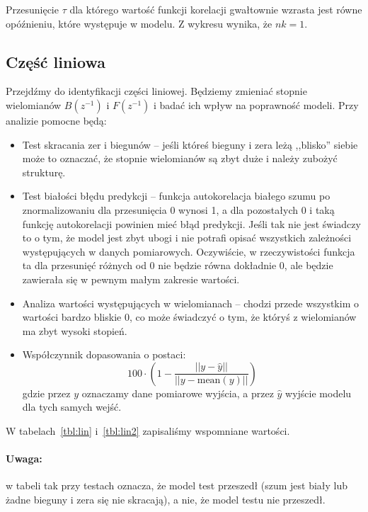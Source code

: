 \documentclass[11pt, a4paper]{article}
\begin{document}
Przesunięcie $\tau$ dla którego wartość funkcji korelacji gwałtownie wzrasta jest równe opóźnieniu, które występuje w modelu. Z wykresu wynika, że $nk = 1$.

\subsection*{Część liniowa}

Przejdźmy do identyfikacji części liniowej. Będziemy zmieniać stopnie wielomianów $B(z^{-1})$ i $F(z^{-1})$ i badać ich wpływ na poprawność modeli. Przy analizie pomocne będą:
\begin{itemize}
\item Test skracania zer i biegunów -- jeśli któreś bieguny i zera leżą ,,blisko'' siebie może to oznaczać, że stopnie wielomianów są zbyt duże i należy zubożyć strukturę.
\item Test białości błędu predykcji -- funkcja autokorelacja białego szumu po znormalizowaniu dla przesunięcia 0 wynosi 1, a dla pozostałych 0 i taką funkcję autokorelacji powinien mieć błąd predykcji. Jeśli tak nie jest świadczy to o tym, że model jest zbyt ubogi i nie potrafi opisać wszystkich zależności występujących w danych pomiarowych. Oczywiście, w rzeczywistości funkcja ta dla przesunięć różnych od 0 nie będzie równa dokładnie 0, ale będzie zawierała się w pewnym małym zakresie wartości.
\item Analiza wartości występujących w wielomianach -- chodzi przede wszystkim o wartości bardzo bliskie 0, co może świadczyć o tym, że któryś z wielomianów ma zbyt wysoki stopień.
\item Współczynnik dopasowania o postaci:
\[
	100 \cdot \left( 1 - \frac{||y - \hat{y}||}{||y - \text{mean}(y)||} \right)
\]
gdzie przez $y$ oznaczamy dane pomiarowe wyjścia, a przez $\hat{y}$ wyjście modelu dla tych samych wejść.
\end{itemize}

W tabelach~\ref{tbl:lin} i~\ref{tbl:lin2} zapisaliśmy wspomniane wartości.

\newcommand{\tak}{\color{green!75!black} tak}
\newcommand{\nie}{\color{red!75!black} nie}

\paragraph{Uwaga:} w tabeli {\tak} przy testach oznacza, że model test przeszedł (szum jest biały lub żadne bieguny i zera się nie skracają), a {\nie}, że model testu nie przeszedł.
\end{document}
